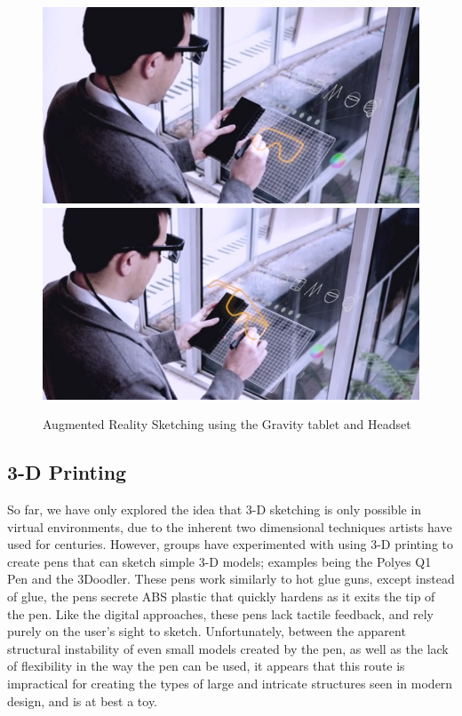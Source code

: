 \documentclass[12pt]{report}
\begin{document}
\begin{figure}
\includegraphics[width=\textwidth]{gravity1.png}
\includegraphics[width=\textwidth]{gravity2.png}
\caption{Augmented Reality Sketching using the Gravity tablet and Headset}
\end{figure}

\subsection{3-D Printing}

So far, we have only explored the idea that 3-D sketching is only possible in virtual environments, due to the inherent two dimensional techniques artists have used for centuries.  
However, groups have experimented with using 3-D printing to create pens that can sketch simple 3-D models; examples being the Polyes Q1 Pen and the 3Doodler.
These pens work similarly to hot glue guns, except instead of glue, the pens secrete ABS plastic that quickly hardens as it exits the tip of the pen.
Like the digital approaches, these pens lack tactile feedback, and rely purely on the user's sight to sketch.
Unfortunately, between the apparent structural instability of even small models created by the pen, as well as the lack of flexibility in the way the pen can be used, it appears that this route is impractical for creating the types of large and intricate structures seen in modern design, and is at best a toy.
\end{document}
